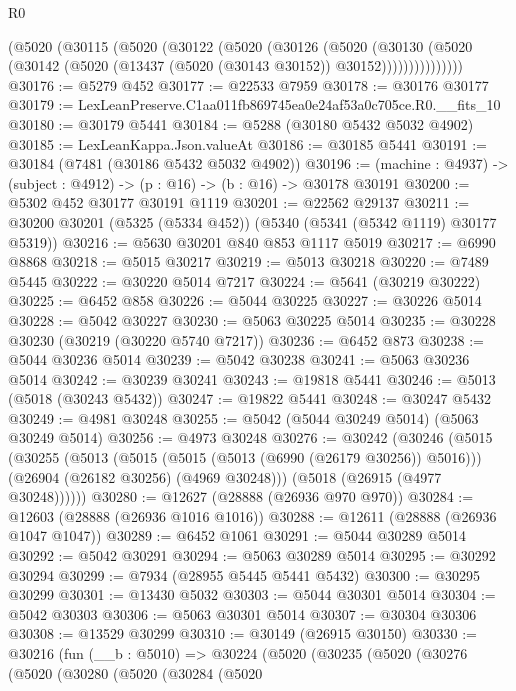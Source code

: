 \begin{lexlean}{R0}
\begin{coremodule}
          (@5020
            (@30115
              (@5020
                (@30122
                  (@5020
                    (@30126
                      (@5020
                        (@30130
                          (@5020
                            (@30142 (@5020 (@13437 (@5020 (@30143 @30152)) @30152)))))))))))))))
@30176 := @5279 @452
@30177 := @22533 @7959
@30178 := @30176 @30177
@30179 := LexLeanPreserve.C1aa011fb869745ea0e24af53a0c705ce.R0.__fits_10
@30180 := @30179 @5441
@30184 := @5288 (@30180 @5432 @5032 @4902)
@30185 := LexLeanKappa.Json.valueAt
@30186 := @30185 @5441
@30191 := @30184 (@7481 (@30186 @5432 @5032 @4902))
@30196 := (machine : @4937) -> (subject : @4912) -> (p : @16) -> (b : @16) -> @30178 @30191
@30200 := @5302 @452 @30177 @30191 @1119
@30201 := @22562 @29137
@30211 := @30200 @30201 (@5325 (@5334 @452)) (@5340 (@5341 (@5342 @1119) @30177 @5319))
@30216 := @5630 @30201 @840 @853 @1117 @5019
@30217 := @6990 @8868
@30218 := @5015 @30217
@30219 := @5013 @30218
@30220 := @7489 @5445
@30222 := @30220 @5014 @7217
@30224 := @5641 (@30219 @30222)
@30225 := @6452 @858
@30226 := @5044 @30225
@30227 := @30226 @5014
@30228 := @5042 @30227
@30230 := @5063 @30225 @5014
@30235 := @30228 @30230 (@30219 (@30220 @5740 @7217))
@30236 := @6452 @873
@30238 := @5044 @30236 @5014
@30239 := @5042 @30238
@30241 := @5063 @30236 @5014
@30242 := @30239 @30241
@30243 := @19818 @5441
@30246 := @5013 (@5018 (@30243 @5432))
@30247 := @19822 @5441
@30248 := @30247 @5432
@30249 := @4981 @30248
@30255 := @5042 (@5044 @30249 @5014) (@5063 @30249 @5014)
@30256 := @4973 @30248
@30276 := @30242
    (@30246
      (@5015
        (@30255
          (@5013
            (@5015 (@5015 (@5013 (@6990 (@26179 @30256)) @5016)))
            (@26904 (@26182 @30256) (@4969 @30248)))
          (@5018 (@26915 (@4977 @30248))))))
@30280 := @12627 (@28888 (@26936 @970 @970))
@30284 := @12603 (@28888 (@26936 @1016 @1016))
@30288 := @12611 (@28888 (@26936 @1047 @1047))
@30289 := @6452 @1061
@30291 := @5044 @30289 @5014
@30292 := @5042 @30291
@30294 := @5063 @30289 @5014
@30295 := @30292 @30294
@30299 := @7934 (@28955 @5445 @5441 @5432)
@30300 := @30295 @30299
@30301 := @13430 @5032
@30303 := @5044 @30301 @5014
@30304 := @5042 @30303
@30306 := @5063 @30301 @5014
@30307 := @30304 @30306
@30308 := @13529 @30299
@30310 := @30149 (@26915 @30150)
@30330 := @30216
    (fun (__b : @5010) =>
    @30224
      (@5020
        (@30235
          (@5020
            (@30276
              (@5020
                (@30280
                  (@5020
                    (@30284
                      (@5020

\end{coremodule}
\end{lexlean}
